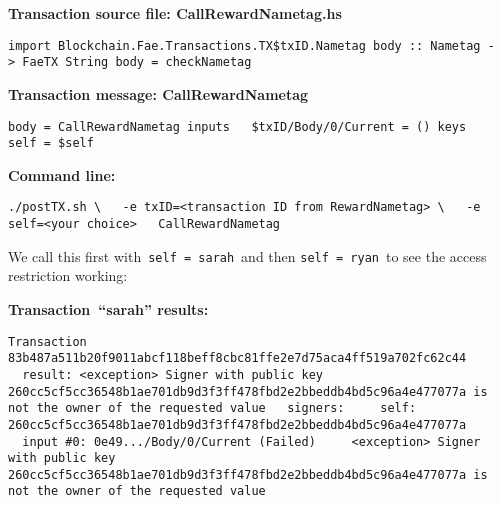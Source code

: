 \documentclass[11pt]{article}
\newcommand{\codeblock}[1]{\begin{mdframed}[
    backgroundcolor=header-color,
    linecolor=header-color,
    innertopmargin=10pt,
    ]{\texttt{#1}}\end{mdframed}}
\begin{document}

\vspace{11pt}

\textbf{Transaction source file: CallRewardNametag.hs}

\codeblock{import Blockchain.Fae.Transactions.TX\$txID.Nametag\newline
\newline
body :: Nametag -\textgreater{} FaeTX String\newline
body = checkNametag}

\textbf{Transaction message: CallRewardNametag}

\codeblock{body = CallRewardNametag\newline
inputs\newline
  \$txID\slash{}Body\slash{}0\slash{}Current = ()\newline
keys\newline
  self = \$self}

\textbf{Command line:}

\codeblock{.\slash{}postTX.sh \textbackslash{}\newline
  -e txID=\textless{}transaction ID from RewardNametag\textgreater{} \textbackslash{}\newline
  -e self=\textless{}your choice\textgreater{}\newline
  CallRewardNametag}

We call this first with \texttt{self = sarah} and then \texttt{self = ryan} to see the access restriction working:


\vspace{11pt}

\textbf{Transaction “sarah” results:}

\codeblock{Transaction 83b487a511b20f9011abcf118beff8cbc81ffe2e7d75aca4ff519a702fc62c44\newline
  result: \textless{}exception\textgreater{} Signer with public key 260cc5cf5cc36548b1ae701db9d3f3ff478fbd2e2bbeddb4bd5c96a4e477077a is not the owner of the requested value\newline
  signers:\newline
    self: 260cc5cf5cc36548b1ae701db9d3f3ff478fbd2e2bbeddb4bd5c96a4e477077a\newline
  input \#0: 0e49...\slash{}Body\slash{}0\slash{}Current (Failed)\newline
    \textless{}exception\textgreater{} Signer with public key 260cc5cf5cc36548b1ae701db9d3f3ff478fbd2e2bbeddb4bd5c96a4e477077a is not the owner of the requested value}
\end{document}
